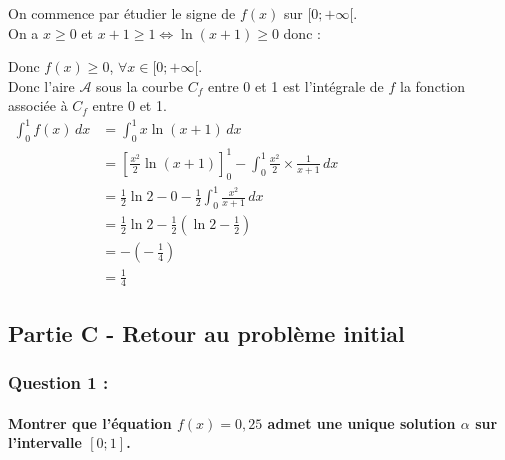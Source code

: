 \documentclass[a4paper, 12pt]{article}
\begin{document}
On commence par étudier le signe de $f(x)$ sur $[0;+\infty[$. 
\\
On a $x \geq 0$ et $x+1 \geq 1 \iff \ln{\left( x+1 \right)}\geq 0$ donc :
\begin{center}
\end{center}
Donc $f(x) \geq 0$, $\forall x \in [0;+\infty[$. 
\\
Donc l'aire $\mathcal{A}$ sous la courbe $C_f$ entre 0 et 1 est l'intégrale de $f$ la fonction associée à $C_f$ entre 0 et 1.
\\
$\begin{aligned}
    \displaystyle \int_0^1 f(x) \,dx &= \displaystyle \int_0^1 x\ln{\left( x+1 \right)} \,dx \\
    &= \left[ \frac{x^2}{2} \ln{\left( x+1 \right)} \right]_0^1 - \displaystyle \int_0^1 \frac{x^2}{2} \times \frac{1}{x+1} \,dx \\
    &= \frac{1}{2}\ln{2} - 0 - \displaystyle \frac{1}{2} \int_0^1 \frac{x^2}{x+1}\,dx \\
    &= \frac{1}{2}\ln{2} - \frac{1}{2}\left( \ln{2} - \frac{1}{2} \right) \\ 
    &= - \left( -\ \frac{1}{4} \right) \\
    &= \frac{1}{4}
\end{aligned}$

{}
\subsection*{Partie C - Retour au problème initial}

{}
\subsubsection*{Question 1 :}
\paragraph*{Montrer que l'équation $f(x) = 0,25$ admet une unique solution  $\alpha$ sur l'intervalle $[0;1]$.\\[5mm]}
\end{document}
